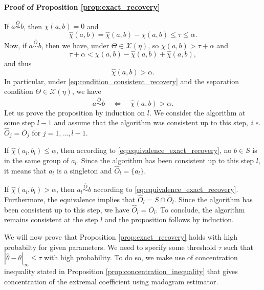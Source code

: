 \documentclass[11pt]{article}
\makeatletter
\theoremstyle{definition}
\renewenvironment{proof}[1][\proofname]{\par
\pushQED{\qed}%
\normalfont \topsep6\p@\@plus6\p@\relax
\trivlist
\item\relax
{\textbf{
#1\@addpunct{ }}}\hspace\labelsep\ignorespaces
}{%
\popQED\endtrivlist\@endpefalse
}
\makeatother
\begin{document}
	\begin{proof}[Proof of Proposition \ref{prop:exact_recovery}]
		If $a \overset{\bar{O}}{\not \sim} b$, then $\chi(a,b) = 0$ and 
		\begin{equation*}
			\hat{\chi}(a,b) = \hat{\chi}(a,b) - \chi(a,b) \leq \tau \leq \alpha.
		\end{equation*}
		Now, if $a \overset{\bar{O}}{\sim} b$, then we have, under $\Theta \in \mathcal{X}(\eta)$, so $\chi(a,b) > \tau + \alpha$ and 
		\begin{equation*}
			\tau + \alpha < \chi(a,b) - \hat{\chi}(a,b) + \hat{\chi}(a,b),
		\end{equation*}
		and thus
		\begin{equation*}
			\hat{\chi}(a,b) > \alpha.
		\end{equation*}
		In particular, under \eqref{eq:condition_consistent_recovery} and the separation condition $\Theta \in \mathcal{X}(\eta)$, we have 
		\begin{equation}
			\label{eq:equivalence_exact_recovery}
		a \overset{\bar{O}}{ \sim } b \quad \Longleftrightarrow \quad \hat{\chi}(a, b) > \alpha.
		\end{equation}
		Let us prove the proposition by induction on $l$. We consider the algorithm at some step $l-1$ and assume that the algorithm was consistent up to this step, \emph{i.e.} $\hat{O}_j = \bar{O}_j$ for $j = 1,\dots,l-1$.
		
		If $\hat{\chi}(a_l,b_l) \leq \alpha$, then according to \eqref{eq:equivalence_exact_recovery}, no $b \in S$ is in the same group of $a_l$. Since the algorithm has been consistent up to this step $l$, it means that $a_l$ is a singleton and $\hat{O}_l = \{a_l\}$.
		
		If $\hat{\chi}(a_l,b_l) > \alpha$, then $a_l \overset{\bar{O}}{\sim} b$ according to \eqref{eq:equivalence_exact_recovery}. Furthermore, the equivalence implies that $\hat{O}_l = S \cap \bar{O}_l$. Since the algorithm has been consistent up to this step, we have $\hat{O}_l = \bar{O}_l$. To conclude, the algorithm remains consistent at the step $l$ and the proposition follows by induction.
		
	\end{proof}
	
	We will now prove that Proposition \ref{prop:exact_recovery} holds with high probabilty for given parameters. We need to specify some threshold $\tau$ such that $|\hat{\theta} - \theta|_{\infty} \leq \tau$ with high probability. To do so, we make use of concentration inequality stated in Proposition \ref{prop:concentration_inequality} that gives concentration of the extremal coefficient using madogram estimator.
	
\end{document}
